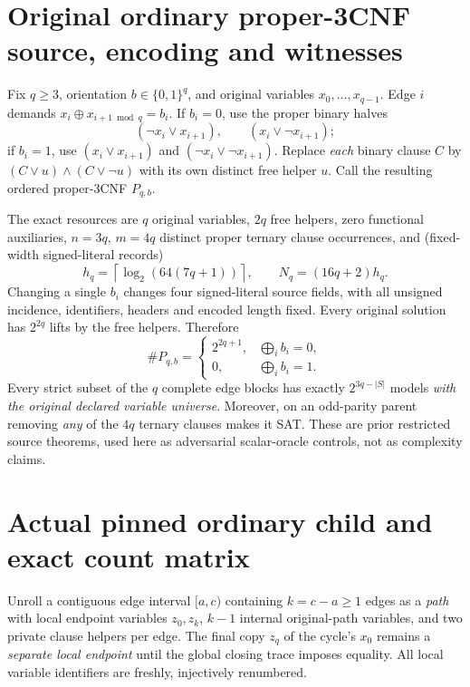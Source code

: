 \documentclass[11pt]{article}
\begin{document}
\section{Original ordinary proper-3CNF source, encoding and witnesses}
Fix $q\ge3$, orientation $b\in\{0,1\}^q$, and original variables
$x_0,\ldots,x_{q-1}$. Edge $i$ demands
$x_i\oplus x_{i+1\bmod q}=b_i$. If $b_i=0$, use the proper binary halves
\[
(\neg x_i\vee x_{i+1}),\qquad(x_i\vee\neg x_{i+1});
\]
if $b_i=1$, use $(x_i\vee x_{i+1})$ and
$(\neg x_i\vee\neg x_{i+1})$. Replace \emph{each} binary clause $C$ by
$(C\vee u)\wedge(C\vee\neg u)$ with its own distinct free helper $u$.
Call the resulting ordered proper-3CNF $P_{q,b}$.

The exact resources are $q$ original variables, $2q$ free helpers,
zero functional auxiliaries, $n=3q$, $m=4q$ distinct proper ternary
clause occurrences, and (fixed-width signed-literal records)
\[
 h_q=\left\lceil\log_2(64(7q+1))\right\rceil,\qquad
 N_q=(16q+2)h_q.                                      \tag{1}
\]
Changing a single $b_i$ changes four signed-literal source fields, with
all unsigned incidence, identifiers, headers and encoded length fixed.
Every original solution has $2^{2q}$ lifts by the free helpers. Therefore
\[
 \#P_{q,b}=
 \begin{cases}2^{2q+1},&\bigoplus_i b_i=0,\\0,&\bigoplus_i b_i=1.
 \end{cases}                                           \tag{2}
\]
Every strict subset of the $q$ complete edge blocks has exactly
$2^{3q-|S|}$ models \emph{with the original declared variable universe}.
Moreover, on an odd-parity parent removing \emph{any} of the $4q$
ternary clauses makes it SAT. These are prior restricted source theorems,
used here as adversarial scalar-oracle controls, not as complexity claims.

\section{Actual pinned ordinary child and exact count matrix}
Unroll a contiguous edge interval $[a,c)$ containing $k=c-a\ge1$
edges as a \emph{path} with local endpoint variables $z_0,z_k$,
$k-1$ internal original-path variables, and two private clause helpers
per edge. The final copy $z_q$ of the cycle's $x_0$ remains a
\emph{separate local endpoint} until the global closing trace imposes
equality. All local variable identifiers are freshly, injectively
renumbered.
\end{document}
